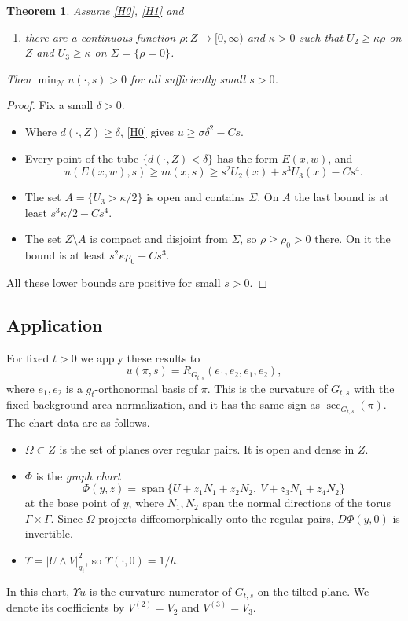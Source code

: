 \documentclass[11pt]{amsart}
\newtheorem{theorem}{Theorem}[section]
\theoremstyle{definition}
\theoremstyle{remark}
\newcommand{\sect}{\operatorname{sec}}
\newcommand{\Gr}{\mathcal{N}}
\newcommand{\Span}{\operatorname{span}}
\begin{document}
\begin{theorem}\label{thm:abstract}
Assume \ref{H0}, \ref{H1} and
\begin{enumerate}[label=(H\arabic*),start=2,leftmargin=*]
\item\label{H2} there are a continuous function $\rho\colon Z\to[0,\infty)$ and $\kappa>0$ such that $U_2\ge\kappa\rho$ on $Z$ and $U_3\ge\kappa$ on $\Sigma=\{\rho=0\}$.
\end{enumerate}
Then $\min_\Gr u(\cdot,s)>0$ for all sufficiently small $s>0$.
\end{theorem}

\begin{proof}
Fix a small $\delta>0$.
\begin{itemize}[leftmargin=*]
\item Where $d(\cdot,Z)\ge\delta$, \ref{H0} gives $u\ge\sigma\delta^2-Cs$.
\item Every point of the tube $\{d(\cdot,Z)<\delta\}$ has the form $E(x,w)$, and
\[ u(E(x,w),s)\ge m(x,s)\ge s^2U_2(x)+s^3U_3(x)-Cs^4 . \]
\item The set $A=\{U_3>\kappa/2\}$ is open and contains $\Sigma$. On $A$ the last bound is at least $s^3\kappa/2-Cs^4$.
\item The set $Z\setminus A$ is compact and disjoint from $\Sigma$, so $\rho\ge\rho_0>0$ there. On it the bound is at least $s^2\kappa\rho_0-Cs^3$.
\end{itemize}
All these lower bounds are positive for small $s>0$.
\end{proof}

\subsection{Application}\label{sec:application}
For fixed $t>0$ we apply these results to
\[ u(\pi,s)=R_{G_{t,s}}(e_1,e_2,e_1,e_2), \]
where $e_1,e_2$ is a $g_t$-orthonormal basis of $\pi$. This is the curvature of $G_{t,s}$ with the fixed background area normalization, and it has the same sign as $\sect_{G_{t,s}}(\pi)$. The chart data are as follows.
\begin{itemize}[leftmargin=*]
\item $\Omega\subset Z$ is the set of planes over regular pairs. It is open and dense in $Z$.
\item $\Phi$ is the \emph{graph chart}
\[ \Phi(y,z)=\Span\{U+z_1N_1+z_2N_2,\ V+z_3N_1+z_4N_2\} \]
at the base point of $y$, where $N_1,N_2$ span the normal directions of the torus $\Gamma\times\Gamma$. Since $\Omega$ projects diffeomorphically onto the regular pairs, $D\Phi(y,0)$ is invertible.
\item $\Upsilon=|U\wedge V|^2_{g_t}$, so $\Upsilon(\cdot,0)=1/h$.
\end{itemize}
In this chart, $\Upsilon u$ is the curvature numerator of $G_{t,s}$ on the tilted plane. We denote its coefficients by $V^{(2)}=V_2$ and $V^{(3)}=V_3$.
\end{document}
